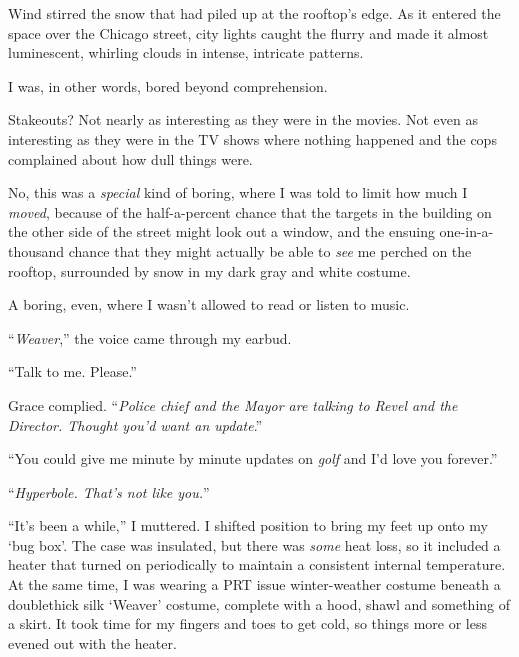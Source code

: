 





Wind stirred the snow that had piled up at the rooftop's edge.  As it entered the space over the Chicago street, city lights caught the flurry and made it almost luminescent, whirling clouds in intense, intricate patterns.



I was, in other words, bored beyond comprehension.



Stakeouts?  Not nearly as interesting as they were in the movies.  Not even as interesting as they were in the TV shows where nothing happened and the cops complained about how dull things were.



No, this was a \emph{special }kind of boring, where I was told to limit how much I \emph{moved}, because of the half-a-percent chance that the targets in the building on the other side of the street might look out a window, and the ensuing one-in-a-thousand chance that they might actually be able to \emph{see} me perched on the rooftop, surrounded by snow in my dark gray and white costume.



A boring, even, where I wasn't allowed to read or listen to music.



``\emph{Weaver},'' the voice came through my earbud.



``Talk to me.  Please.''



Grace complied.  ``\emph{Police chief and the Mayor are talking to Revel and the Director.  Thought you'd want an update}.''



``You could give me minute by minute updates on \emph{golf} and I'd love you forever.''



``\emph{Hyperbole.  That's not like you.}''



``It's been a while,'' I muttered.  I shifted position to bring my feet up onto my `bug box'.  The case was insulated, but there was \emph{some} heat loss, so it included a heater that turned on periodically to maintain a consistent internal temperature.  At the same time, I was wearing a PRT issue winter-weather costume beneath a doublethick silk `Weaver' costume, complete with a hood, shawl and something of a skirt.  It took time for my fingers and toes to get cold, so things more or less evened out with the heater.



